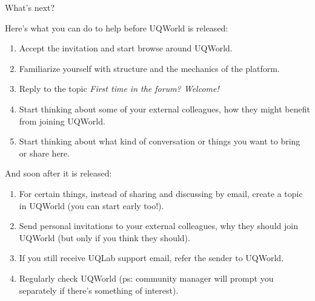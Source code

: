 \documentclass[]{rsuqbeamernew}
\begin{document}
\begin{frame}[t]{What's next?}
  
Here's what you can do to help before UQWorld is released:

\begin{enumerate}
  \item Accept the invitation and start browse around UQWorld.
  \item Familiarize yourself with structure and the mechanics of the platform.
  \item Reply to the topic \emph{First time in the forum? Welcome!}
  \item Start thinking about some of your external colleagues, how they might benefit from joining UQWorld.
  \item Start thinking about what kind of conversation or things you want to bring or share here.
\end{enumerate}

And soon after it is released:

\begin{enumerate}
  \item For certain things, instead of sharing and discussing by email, create a topic in UQWorld (you can start early too!).  %
  \item Send personal invitations to your external colleagues, why they should join UQWorld (but only if you think they should).
  \item If you still receive UQLab support email, refer the sender to UQWorld.
  \item Regularly check UQWorld (ps: community manager will prompt you separately if there's something of interest).
\end{enumerate}

\end{frame}
\end{document}
